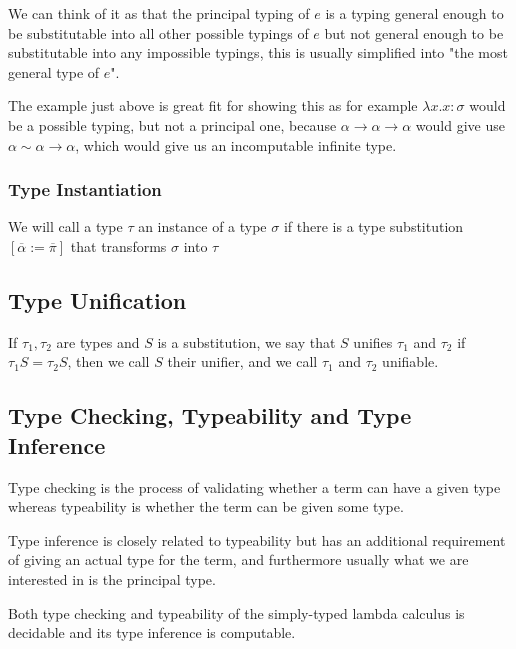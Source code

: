 We can think of it as that the principal typing of $e$ is a typing general enough to be substitutable into all other possible typings of $e$
but not general enough to be substitutable into any impossible typings, this is usually simplified into "the most general type of $e$". %

The example just above %
is great fit for showing this as for example $\lambda x . x : \sigma$ would be a possible typing, but not a principal one, because
$\alpha \rightarrow \alpha \rightarrow \alpha$ would give use $\alpha \sim \alpha \rightarrow \alpha$, which would give us an incomputable
infinite type.

\subsubsection{Type Instantiation}

We will call a type $\tau$ an instance of a type $\sigma$ if there is a type substitution $[\overline{\alpha} := \overline{\pi}]$
that transforms $\sigma$ into $\tau$ %

\subsection{Type Unification}

If $\tau_1, \tau_2$ are types and $S$ is a substitution, we say that $S$ unifies $\tau_1$ and $\tau_2$ if $\tau_1 S = \tau_2 S$, then we call $S$ their unifier, and we call $\tau_1$ and $\tau_2$ unifiable. %


\subsection{Type Checking, Typeability and Type Inference}

Type checking is the process of validating whether a term can have a given type whereas typeability is whether the term can be given some type. %

Type inference is closely related to typeability but has an additional requirement of giving an actual type for the term, and furthermore usually what we are interested in is the principal type.

Both type checking and typeability of the simply-typed lambda calculus is decidable and its type inference is computable. %


